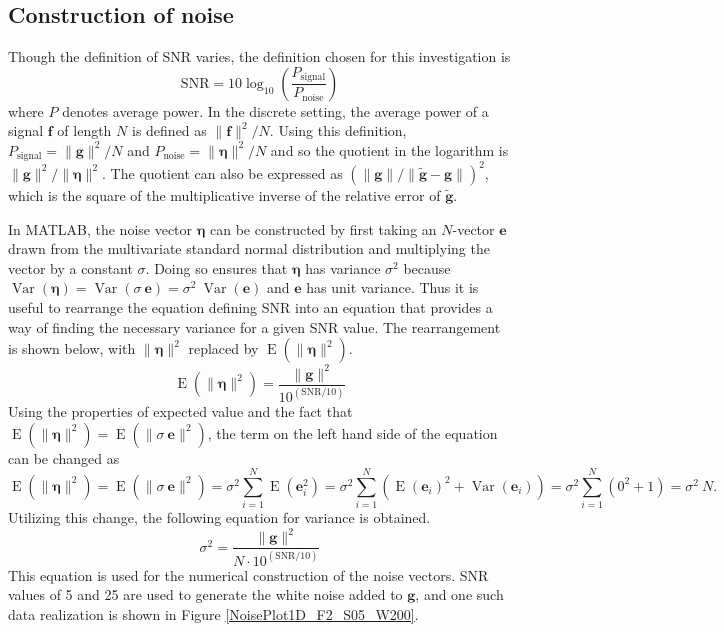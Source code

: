 \documentclass[12pt]{article}
\newcommand{\gdis}{\mathbf{g}}
\newcommand{\gnoise}{\widetilde{\mathbf{g}}}
\newcommand{\noiseSD}{\sigma}	%
\newcommand{\noise}{\bm{\eta}}	%
\newcommand{\Var}{\operatorname{Var}}	%
\newcommand{\E}{\operatorname{E}}	%
\begin{document}
\subsection{Construction of noise} \label{Construction of noise}

Though the definition of SNR varies, the definition chosen for this investigation is
\begin{equation}
\label{Eq_SNR}
\text{SNR} = 10\log_{10}\left(\frac{P_{\text{signal}}}{P_{\text{noise}}}\right)
\end{equation}
where $P$ denotes average power. In the discrete setting, the average power of a signal $\mathbf{f}$ of length $N$ is defined as $\|\mathbf{f}\|^2/N$. Using this definition, $P_{\text{signal}} = \|\gdis\|^2/N$ and $P_{\text{noise}} = \|\noise\|^2/N$ and so the quotient in the logarithm is $\|\gdis\|^2/\|\noise\|^2$. The quotient can also be expressed as $(\|\gdis\|/\|\gnoise - \gdis\|)^2$, which is the square of the multiplicative inverse of the relative error of $\gnoise$. \par
In MATLAB, the noise vector $\noise$ can be constructed by first taking an $N$-vector $\mathbf{e}$ drawn from the multivariate standard normal distribution and multiplying the vector by a constant $\noiseSD$. Doing so ensures that $\noise$ has variance $\noiseSD^2$ because $\Var(\noise) = \Var(\noiseSD\:\mathbf{e}) = \noiseSD^2\:\Var(\mathbf{e})$ and $\mathbf{e}$ has unit variance. Thus it is useful to rearrange the equation defining SNR into an equation that provides a way of finding the necessary variance for a given SNR value. The rearrangement is shown below, with $\|\noise\|^2$ replaced by $\E(\|\noise\|^2)$.
\[\E(\|\noise\|^2) = \frac{\|\gdis\|^2}{10^{(\text{SNR}/10)}}\]
Using the properties of expected value and the fact that $\E(\|\noise\|^2) = \E(\|\noiseSD\:\mathbf{e}\|^2)$, the term on the left hand side of the equation can be changed as
\[\E(\|\noise\|^2) = \E(\|\noiseSD\:\mathbf{e}\|^2) = \noiseSD^2 \sum_{i=1}^N \E(\mathbf{e}_i^2) = \noiseSD^2 \sum_{i=1}^N \left(\E(\mathbf{e}_i)^2 + \Var(\mathbf{e}_i)\right) = \noiseSD^2 \sum_{i=1}^N \left(0^2 + 1\right) = \noiseSD^2\:N.\]
Utilizing this change, the following equation for variance is obtained.
\begin{equation}
\label{Eq_Var}
\noiseSD^2 = \frac{\|\gdis\|^2}{N \cdot 10^{(\text{SNR}/10)}}
\end{equation}
This equation is used for the numerical construction of the noise vectors. SNR values of 5 and 25 are used to generate the white noise added to $\gdis$, and one such data realization is shown in Figure \ref{NoisePlot1D_F2_S05_W200}. \par
\end{document}
